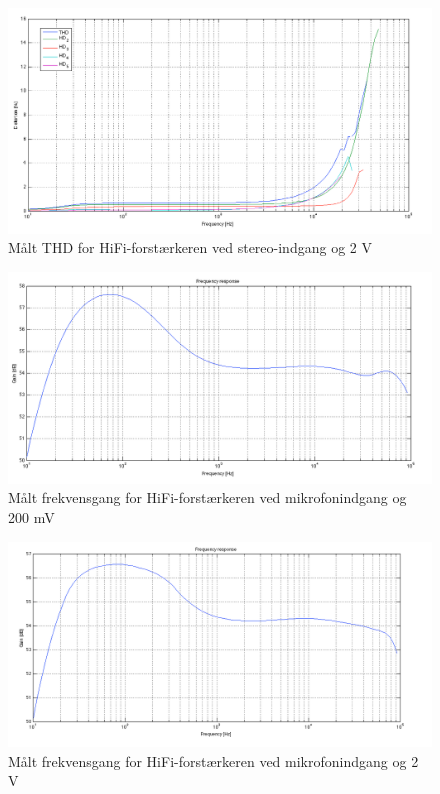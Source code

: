 \begin{figure}[h]
\centering
\includegraphics[width=\textwidth]{maalerapporter/final/stereo/final_stereo_2v_thd.png}
\caption{Målt THD for HiFi-forstærkeren ved stereo-indgang og 2 V}
\label{maalerapport_final4}
\end{figure}

\begin{figure}[h]
\centering
\includegraphics[width=\textwidth]{maalerapporter/final/mic/final_mic_3,16mv_frekvensgang.png}
\caption{Målt frekvensgang for HiFi-forstærkeren ved mikrofonindgang og 200 mV}
\label{maalerapport_final5}
\end{figure}

\begin{figure}[h]
\centering
\includegraphics[width=\textwidth]{maalerapporter/final/mic/final_mic_31,6mv_frekevensgang.png}
\caption{Målt frekvensgang for HiFi-forstærkeren ved mikrofonindgang og 2 V}
\label{maalerapport_final6}
\end{figure}

